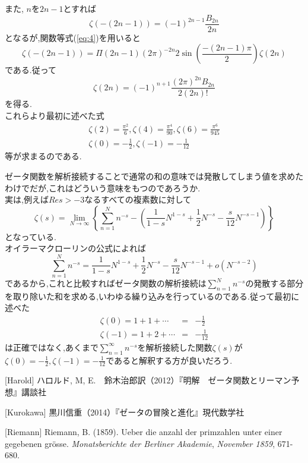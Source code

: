 また, $n$を$2n-1$とすれば
\[
\zeta(-(2n-1))=(-1)^{2n-1}\frac{B_{2n}}{2n}
\]
となるが,関数等式(\ref{eq:4})を用いると
\[
\zeta(-(2n-1))=\Pi(2n-1)(2\pi)^{-2n}2\sin\left(\frac{-(2n-1)\pi}{2}\right)\zeta(2n)
\]
である.従って
\[
\zeta(2n)=(-1)^{n+1}\frac{(2\pi)^{2n}B_{2n}}{2(2n)!}
\]
を得る.\\
これらより最初に述べた式
\begin{eqnarray*}
\zeta(2)=\frac{\pi^2}{6}, \zeta(4)=\frac{\pi^4}{90}, \zeta(6)=\frac{\pi^6}{945}\\
\zeta(0)=-\frac{1}{2}, \zeta(-1)=-\frac{1}{12}
\end{eqnarray*}
等が求まるのである.

ゼータ関数を解析接続することで通常の和の意味では発散してしまう値を求めたわけでだが,これはどういう意味をもつのであろうか.\\
実は,例えば$Re s>-3$なるすべての複素数に対して
\[
\zeta(s)=\lim_{N\to\infty}\left\{\sum_{n=1}^N n^{-s}-\left(\frac{1}{1-s}N^{1-s}+\frac{1}{2}N^{-s}-\frac{s}{12}N^{-s-1}\right)\right\}
\]
となっている.\\
オイラーマクローリンの公式によれば
\[
\sum_{n=1}^N n^{-s}=\frac{1}{1-s}N^{1-s}+\frac{1}{2}N^{-s}-\frac{s}{12}N^{-s-1}+o(N^{-s-2})
\]
であるから,これと比較すればゼータ関数の解析接続は$\sum_{n=1}^N n^{-s}$の発散する部分を取り除いた和を求める,いわゆる繰り込みを行っているのである.従って最初に述べた
\begin{eqnarray*}
\zeta(0)=1+1+\cdots &=& -\frac{1}{2}\\
\zeta(-1)=1+2+\cdots &=& -\frac{1}{12}
\end{eqnarray*}
は正確ではなく,あくまで$\sum_{n=1}^\infty n^{-s}$を解析接続した関数$\zeta(s)$が$\zeta(0)=-\frac{1}{2},\zeta(-1)=-\frac{1}{12}$であると解釈する方が良いだろう.
\begin{description}
\item{[Harold]} ハロルド, M, E.　鈴木治郎訳（2012）『明解　ゼータ関数とリーマン予想』講談社
\item{[Kurokawa]} 黒川信重（2014）『ゼータの冒険と進化』現代数学社
\item{[Riemann]} Riemann, B. (1859). Ueber die anzahl der primzahlen unter einer gegebenen gr\"{o}sse. \textit{Monatsberichte der Berliner Akademie}, \textit{November 1859}, 671-680.
\end{description}

